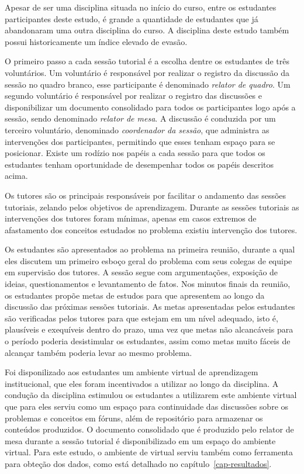 Apesar de ser uma disciplina situada no início do
curso, entre os estudantes participantes deste estudo,
é grande a quantidade de estudantes que já abandonaram uma
outra disciplina do curso.
A disciplina deste estudo também possui historicamente um índice
elevado de evasão.



O primeiro passo a cada sessão tutorial é a escolha dentre os
estudantes de três voluntários.
Um voluntário é responsável por realizar o registro da discussão
da sessão no quadro branco, esse
participante é denominado \textit{relator de quadro}.
Um segundo voluntário é responsável por realizar o registro
das discussões e disponibilizar um documento consolidado para todos
os participantes logo após
a sessão, sendo denominado \textit{relator de mesa}.
A discussão é conduzida por um terceiro voluntário,
denominado \textit{coordenador da sessão}, que administra
as intervenções dos participantes, permitindo que esses
tenham espaço para se posicionar.
Existe um rodízio nos papéis a cada sessão para que todos
os estudantes tenham oportunidade de desempenhar todos
os papéis descritos acima.

Os tutores são os principais responsáveis por facilitar o andamento
das sessões tutoriais, zelando pelos objetivos de aprendizagem.
Durante as sessões tutoriais as intervenções dos tutores
foram mínimas, apenas em casos extremos de
afastamento dos conceitos estudados no problema existiu intervenção dos tutores.

Os estudantes são apresentados ao problema na primeira reunião, durante
a qual eles discutem um primeiro esboço geral do problema com seus
colegas de equipe em supervisão dos tutores.
A sessão segue com argumentações, exposição de ideias,
questionamentos e levantamento de fatos.
Nos minutos finais da reunião, os estudantes propõe metas de estudos para
que apresentem ao longo da discussão das próximas sessões tutoriais.
As metas apresentadas pelos estudantes são verificadas pelos tutores
para que estejam em um nível adequado, isto é, plausíveis e exequíveis
dentro do prazo, uma vez que metas não
alcancáveis para o período poderia desistimular os estudantes, assim
como metas muito fáceis de alcançar também poderia levar
ao mesmo problema.

Foi disponilizado aos estudantes um ambiente virtual de aprendizagem
institucional, que eles foram incentivados a utilizar ao longo
da disciplina.
A condução da disciplina estimulou os estudantes a
utilizarem este ambiente virtual que para eles serviu como um
espaço para continuidade das discussões sobre os problemas
e conceitos em fóruns, além de repositório para armazenar
os conteúdos produzidos.
O documento consolidado que é produzido pelo relator de mesa
durante a sessão tutorial é disponibilizado em um espaço
do ambiente virtual.
Para este estudo, o ambiente de virtual serviu
também como ferramenta para obteção dos dados,
como está detalhado no
capítulo~\ref{cap-resultados}.


